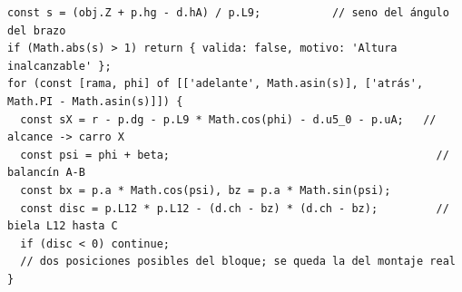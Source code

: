 \begin{lstlisting}[style=js, caption={Cinemática inversa (fragmento de \texttt{web/js/cinematica.js}).}]
const s = (obj.Z + p.hg - d.hA) / p.L9;           // seno del ángulo del brazo
if (Math.abs(s) > 1) return { valida: false, motivo: 'Altura inalcanzable' };
for (const [rama, phi] of [['adelante', Math.asin(s)], ['atrás', Math.PI - Math.asin(s)]]) {
  const sX = r - p.dg - p.L9 * Math.cos(phi) - d.u5_0 - p.uA;   // alcance -> carro X
  const psi = phi + beta;                                         // balancín A-B
  const bx = p.a * Math.cos(psi), bz = p.a * Math.sin(psi);
  const disc = p.L12 * p.L12 - (d.ch - bz) * (d.ch - bz);         // biela L12 hasta C
  if (disc < 0) continue;
  // dos posiciones posibles del bloque; se queda la del montaje real
}
\end{lstlisting}
